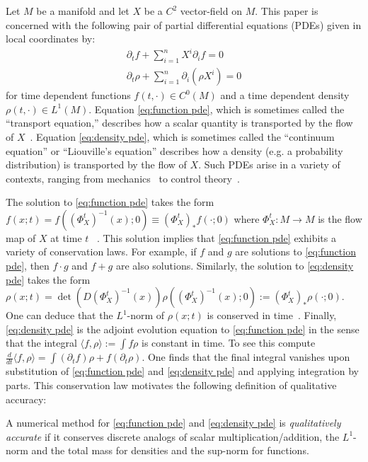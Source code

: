 \documentclass[final,leqno]{siamart}
\begin{document}
Let $M$ be a manifold and let $X$ be a $C^2$ vector-field on $M$. 
This paper is concerned with the following pair of partial differential equations (PDEs) given in local coordinates by:
\begin{align}
	\partial_{t} f + \sum_{i=1}^n X^{i} \partial_{i} f = 0 \label{eq:function pde} \\
	\partial_{t} \rho + \sum_{i=1}^n \partial_{i} (\rho X^{i}) = 0 \label{eq:density pde}
\end{align}
for time dependent functions $f(t,\cdot) \in C^0(M)$ and a time dependent density $\rho(t,\cdot) \in L^1(M)$.
Equation \eqref{eq:function pde}, which is sometimes called the ``transport equation,'' describes how a scalar quantity is transported by the flow of $X$~\cite{Truesdell1991}.
Equation \eqref{eq:density pde}, which is sometimes called the ``continuum equation'' or ``Liouville's equation'' describes how a density (e.g. a probability distribution) is transported by the flow of $X$.
Such PDEs arise in a variety of contexts, ranging from  mechanics~\cite{Truesdell1991} to control theory~\cite{HenrionKorda2014}.

The solution to \eqref{eq:function pde} takes the form $f(x;t) = f( (\Phi_{X}^{t})^{-1}(x) ; 0) \equiv (\Phi_{X}^{t})_{*} f(\cdot;0)$
where $\Phi_{X}^{t}:M \to M$ is the flow map of $X$ at time $t$ ~\cite[Chapter 18]{Lee2006}.
This solution implies that \eqref{eq:function pde} exhibits a variety of conservation laws.
For example, if $f$ and $g$ are solutions to \eqref{eq:function pde},
then $f \cdot g$ and $f+g$ are also solutions.
Similarly, the solution to \eqref{eq:density pde} takes the form $\rho(x;t) = \det( D(\Phi_{X}^{t})^{-1}(x) ) \rho( (\Phi_{X}^{t})^{-1}(x) ;0) := (\Phi_{X}^{t})_{*} \rho(\cdot;0)$.
One can deduce that the $L^{1}$-norm of $\rho(x;t)$ is conserved in time~\cite[Theorem 16.42]{Lee2006}.
Finally, \eqref{eq:density pde} is the adjoint evolution equation to \eqref{eq:function pde} in the sense that the integral $\langle f , \rho \rangle := \int f \rho$ is constant in time. To see this compute
$\frac{d}{dt} \langle f , \rho \rangle = \int ( \partial_{t} f ) \rho + f ( \partial_{t} \rho) $.  One finds that the final integral vanishes upon substitution of \eqref{eq:function pde} and \eqref{eq:density pde} and applying integration by parts.
This conservation law motivates the following definition of qualitative accuracy:

\begin{definition} \label{def:quality}
	    A numerical method for \eqref{eq:function pde} and \eqref{eq:density pde} is \emph{qualitatively accurate} if it conserves discrete analogs of scalar multiplication/addition, the $L^{1}$-norm and the total mass for densities and the sup-norm for functions.
\end{definition}
\end{document}
